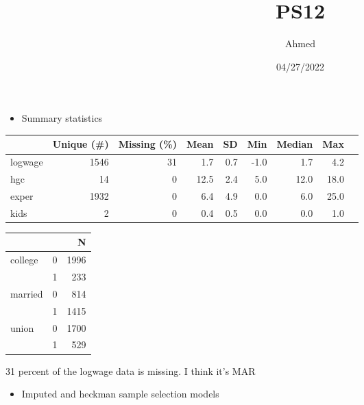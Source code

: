 \documentclass[
]{article}
\title{PS12}
\author{Ahmed}
\date{04/27/2022}
\providecommand{\tightlist}{%
  \setlength{\itemsep}{0pt}\setlength{\parskip}{0pt}}
\begin{document}
\maketitle

\begin{itemize}
\tightlist
\item
  Summary statistics
\end{itemize}

\begin{longtable}[]{@{}lrrrrrrrr@{}}
\toprule
& Unique (\#) & Missing (\%) & Mean & SD & Min & Median & Max & \\
\midrule
\endhead
logwage & 1546 & 31 & 1.7 & 0.7 & -1.0 & 1.7 & 4.2 & \\
hgc & 14 & 0 & 12.5 & 2.4 & 5.0 & 12.0 & 18.0 & \\
exper & 1932 & 0 & 6.4 & 4.9 & 0.0 & 6.0 & 25.0 & \\
kids & 2 & 0 & 0.4 & 0.5 & 0.0 & 0.0 & 1.0 & \\
\bottomrule
\end{longtable}

\begin{longtable}[]{@{}llr@{}}
\toprule
& & N \\
\midrule
\endhead
college & 0 & 1996 \\
& 1 & 233 \\
married & 0 & 814 \\
& 1 & 1415 \\
union & 0 & 1700 \\
& 1 & 529 \\
\bottomrule
\end{longtable}

31 percent of the logwage data is missing. I think it's MAR

\newpage

\begin{itemize}
\tightlist
\item
  Imputed and heckman sample selection models
\end{itemize}
\end{document}
